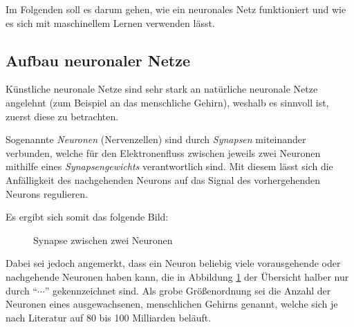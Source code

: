 \documentclass[12pt,a4]{article}
\begin{document}
Im Folgenden soll es darum gehen, wie ein neuronales Netz funktioniert und wie es sich mit maschinellem Lernen verwenden lässt.

\subsection{Aufbau neuronaler Netze \cite{NeuronaleNetzeImKlartext}}\label{sec:BasicStructure}
Künstliche neuronale Netze sind sehr stark an natürliche neuronale Netze angelehnt (zum Beispiel an das menschliche Gehirn), weshalb es sinnvoll ist, zuerst diese zu betrachten.

Sogenannte \textit{Neuronen} (Nervenzellen) sind durch \textit{Synapsen} miteinander verbunden, welche für den Elektronenfluss zwischen jeweils zwei Neuronen mithilfe eines \textit{Synapsengewichts} verantwortlich sind. Mit diesem lässt sich die Anfälligkeit des nachgehenden Neurons auf das Signal des  vorhergehenden Neurons regulieren. \cite{Synapsengewicht}

Es ergibt sich somit das folgende Bild:
\begin{figure}[!h]
\centering
{}
\caption{Synapse zwischen zwei Neuronen}
\label{fig:Neuronenverbindung}
\end{figure}

Dabei sei jedoch angemerkt, dass ein Neuron beliebig viele vorausgehende oder nachgehende Neuronen haben kann, die in Abbildung \ref{fig:Neuronenverbindung} der Übersicht halber nur durch \enquote{$\cdots$} gekennzeichnet sind. Als grobe Größenordnung sei die Anzahl der Neuronen eines ausgewachsenen, menschlichen Gehirns genannt, welche sich je nach Literatur auf 80 bis 100 Milliarden beläuft.
\end{document}
